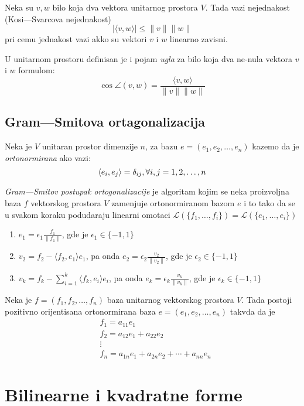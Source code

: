 \documentclass[12p,a4paper]{article}
\begin{document}
\begin{multicols}{2}
    Neka su $v, w$ bilo koja dva vektora unitarnog prostora $V$. Tada vazi 
    nejednakost (Kosi---Svarcova nejednakost)
    \[ | \langle v, w \rangle | \leq \|v\| \|w\| \]
    pri cemu jednakost vazi akko su vektori $v$ i $w$ linearno zavisni.

    U unitarnom prostoru definisan je i pojam \textit{ugla} za bilo koja dva 
    ne-nula vektora $v$ i $w$ formulom:
    \[
        \cos \angle (v, w) = \frac{\langle v, w \rangle}{\|v\| \|w\|}
    \]

\subsection{Gram---Smitova ortagonalizacija}

    Neka je $V$ unitaran prostor dimenzije $n$, za bazu 
    $e = (e_1, e_2, \ldots, e_n)$ kazemo da je \textit{ortonormirana} ako vazi:
    \[\langle e_i, e_j \rangle = \delta_{ij}, \\ \forall i,j = 1,2,\ldots, n\]

    \textit{Gram---Smitov postupak ortogonalizacije} je algoritam kojim se 
    neka proizvoljna baza $f$ vektorskog prostora $V$ zamenjuje ortonormiranom 
    bazom $e$ i to tako da se u svakom koraku podudaraju linearni omotaci 
    $\mathcal{L}(\{ f_1, \ldots, f_i\}) = \mathcal{L}(\{ e_1, \ldots, e_i \})$

    \begin{enumerate}
        \itemsep0em
        \item $e_1 = \epsilon_1 \frac{f_1}{\| f_1 \|}$, gde je 
            $\epsilon_1 \in \{-1, 1\}$
        \item $v_2 = f_2 - \langle f_2, e_1 \rangle e_1$, pa onda
            $e_2 = \epsilon_2 \frac{v_2}{\| v_2 \|}$, gde je 
            $\epsilon_2 \in \{-1, 1\}$
        \item $v_k = f_k - \sum_{i=1}^k \langle f_k, e_i \rangle e_i$, pa onda
            $e_k = \epsilon_k \frac{v_k}{\| v_k \|}$, gde je 
            $\epsilon_k \in \{-1, 1\}$
    \end{enumerate}

    Neka je $f = (f_1, f_2, \ldots, f_n)$ baza unitarnog vektorskog prostora 
    $V$. Tada postoji pozitivno orijentisana ortonormirana baza 
    $e=(e_1, e_2, \ldots, e_n)$ takvda da je
    \begin{align}
        & f_1 = a_{11} e_1 \\
        & f_2 = a_{12} e_1 + a_{22} e_2 \\
        & \vdots \\
        & f_n = a_{1n} e_1 + a_{2n} e_2 + \cdots + a_{nn} e_n
    \end{align}

\section{Bilinearne i kvadratne forme}
 
\end{multicols}
\end{document}

